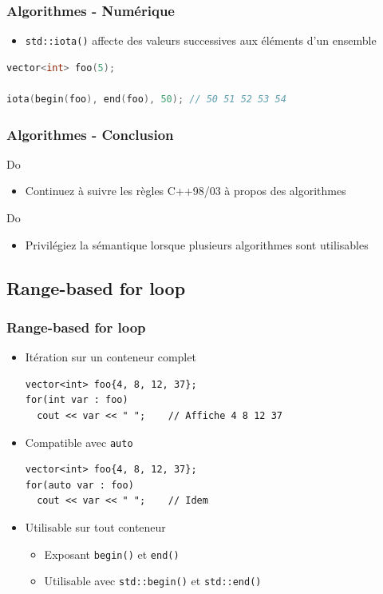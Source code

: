 \documentclass[C++.tex]{subfiles}
\begin{document}
\begin{frame}[fragile]
	\frametitle{Algorithmes - Numérique}
	\begin{itemize}
		\item \lstinline|std::iota()| affecte des valeurs successives aux éléments d'un ensemble
	\end{itemize}

	\begin{lstlisting}[language=C++]
vector<int> foo(5);

iota(begin(foo), end(foo), 50); // 50 51 52 53 54\end{lstlisting}
\end{frame}

\begin{frame}[fragile]
	\frametitle{Algorithmes - Conclusion}
	\begin{exampleblock}{Do}
		\begin{itemize}
			\item Continuez à suivre les règles C++98/03 à propos des algorithmes
		\end{itemize}
	\end{exampleblock}

	\begin{exampleblock}{Do}
		\begin{itemize}
			\item Privilégiez la sémantique lorsque plusieurs algorithmes sont utilisables
		\end{itemize}
	\end{exampleblock}
\end{frame}

\subsection*{Range-based for loop}
\begin{frame}[fragile]
	\frametitle{Range-based for loop}
	\begin{itemize}
		\item Itération sur un \og conteneur\fg{} complet

	\begin{lstlisting}
vector<int> foo{4, 8, 12, 37};
for(int var : foo)
  cout << var << " ";    // Affiche 4 8 12 37\end{lstlisting}

		\item Compatible avec \lstinline|auto|

	\begin{lstlisting}
vector<int> foo{4, 8, 12, 37};
for(auto var : foo)
  cout << var << " ";    // Idem\end{lstlisting}

		\item Utilisable sur tout conteneur
		\begin{itemize}
			\item Exposant \lstinline|begin()| et \lstinline|end()|
			\item Utilisable avec \lstinline|std::begin()| et \lstinline|std::end()|
		\end{itemize}
	\end{itemize}
\end{frame}
\end{document}
